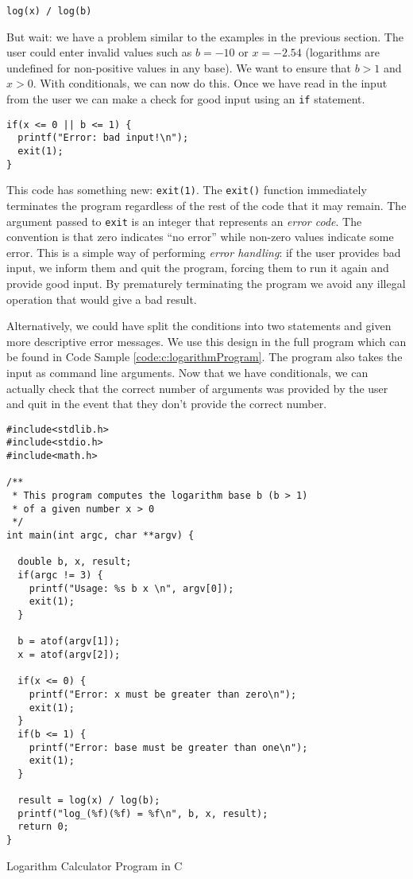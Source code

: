   \texttt{log(x) / log(b)}
  
But wait: we have a problem similar to the examples in the previous section.  
The user could enter invalid values such as $b = -10$ or $x = -2.54$ 
(logarithms are undefined for non-positive values in any base).  We want
to ensure that $b > 1$ and $x > 0$.  With conditionals, we can now do this.  
Once we have read in the input from the user we can make a check for
good input using an \texttt{if} statement.

\begin{verbatim}
if(x <= 0 || b <= 1) {
  printf("Error: bad input!\n");
  exit(1);
}
\end{verbatim}

This code has something new: \texttt{exit(1)}.  The \texttt{exit()}
function immediately terminates the program regardless of the rest of the
code that it may remain.  The argument passed to \texttt{exit} is an 
integer that represents an \emph{error code}.  The convention is that 
zero indicates ``no error'' while non-zero values indicate some error.  This
is a simple way of performing \emph{error handling}: if the user provides
bad input, we inform them and quit the program, forcing them to run it
again and provide good input.  By prematurely terminating the program
we avoid any illegal operation that would give a bad result.

Alternatively, we could have split the conditions into two statements and given
more descriptive error messages.  We use this design in the full program 
which can be found in Code Sample \ref{code:c:logarithmProgram}.  The 
program also takes the input as command line arguments.  Now that we have
conditionals, we can actually check that the correct number of arguments
was provided by the user and quit in the event that they don't provide
the correct number.

\begin{listing}[h]
\begin{verbatim}
#include<stdlib.h>
#include<stdio.h>
#include<math.h>

/**
 * This program computes the logarithm base b (b > 1) 
 * of a given number x > 0
 */
int main(int argc, char **argv) {

  double b, x, result;
  if(argc != 3) {
    printf("Usage: %s b x \n", argv[0]);
    exit(1);
  }  
  
  b = atof(argv[1]);
  x = atof(argv[2]);

  if(x <= 0) {
    printf("Error: x must be greater than zero\n");
    exit(1);
  }
  if(b <= 1) {
    printf("Error: base must be greater than one\n");
    exit(1);
  }

  result = log(x) / log(b);
  printf("log_(%f)(%f) = %f\n", b, x, result);
  return 0;
}
\end{verbatim}
\caption{Logarithm Calculator Program in C}
\label{code:c:logarithmProgram}
\end{listing}


